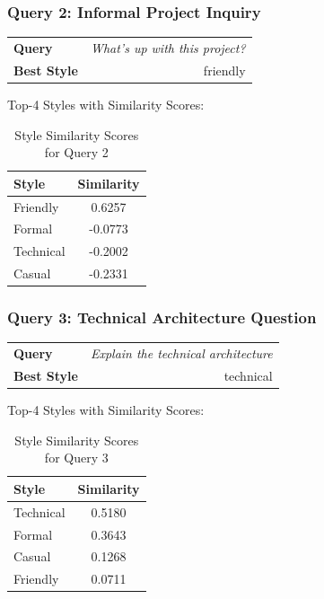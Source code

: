 \documentclass[11pt,a4paper]{article}
\begin{document}
\subsubsection{Query 2: Informal Project Inquiry}

\begin{table}[H]
\centering
\begin{tabular}{|l|r|}
\toprule
\textbf{Query} & \textit{What's up with this project?} \\
\textbf{Best Style} & friendly \\
\bottomrule
\end{tabular}
\end{table}

Top-4 Styles with Similarity Scores:
\begin{table}[H]
\centering
\begin{tabular}{|l|c|}
\toprule
\textbf{Style} & \textbf{Similarity} \\
\midrule
Friendly & 0.6257 \\
Formal & -0.0773 \\
Technical & -0.2002 \\
Casual & -0.2331 \\
\bottomrule
\end{tabular}
\caption{Style Similarity Scores for Query 2}
\end{table}

\subsubsection{Query 3: Technical Architecture Question}

\begin{table}[H]
\centering
\begin{tabular}{|l|r|}
\toprule
\textbf{Query} & \textit{Explain the technical architecture} \\
\textbf{Best Style} & technical \\
\bottomrule
\end{tabular}
\end{table}

Top-4 Styles with Similarity Scores:
\begin{table}[H]
\centering
\begin{tabular}{|l|c|}
\toprule
\textbf{Style} & \textbf{Similarity} \\
\midrule
Technical & 0.5180 \\
Formal & 0.3643 \\
Casual & 0.1268 \\
Friendly & 0.0711 \\
\bottomrule
\end{tabular}
\caption{Style Similarity Scores for Query 3}
\end{table}
\end{document}
